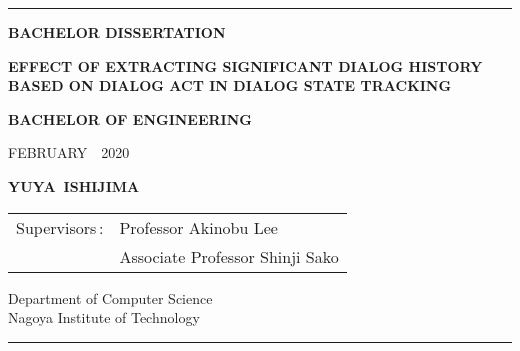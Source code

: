 \vspace*{1cm}
\begin{center}
\rule{\textwidth}{.9pt}
\vspace*{2mm}

\uppercase{\large \bfseries BACHELOR DISSERTATION}

\vspace*{1.5cm}

\uppercase{\Large \bfseries Effect of extracting significant dialog history based on dialog act in dialog state tracking}

\vspace*{2cm}

\uppercase{\large \bfseries BACHELOR OF ENGINEERING}

\vspace*{1.5cm}

\uppercase{\large FEBRUARY~~2020}

\vspace*{4mm}

\uppercase{\large \bfseries YUYA~ISHIJIMA}

\vspace*{2.5cm}

{\large
\begin{tabular}{rl}
  Supervisors\,:&
  Professor Akinobu Lee\\
  &Associate Professor Shinji Sako
\end{tabular}
}

\vspace*{1.5cm}

{\large Department of Computer Science\\
  Nagoya Institute of Technology}

\vspace*{2mm}
\rule{\textwidth}{.9pt}
\end{center}
